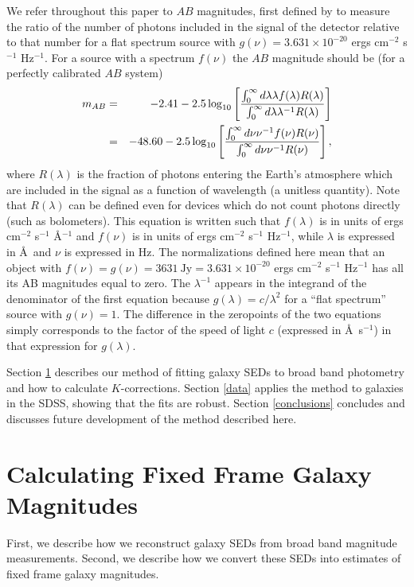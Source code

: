 \documentclass[10pt,preprint]{aastex}
\begin{document}
We refer throughout this paper to $AB$ magnitudes, first defined by
\citet{oke83a} to measure the ratio of the number of photons included
in the signal of the detector relative to that number for a flat
spectrum source with $g(\nu)=3.631 \times 10^{-20}$ ergs cm$^{-2}$
s$^{-1}$ Hz$^{-1}$. For a source with a spectrum $f(\nu)$ the $AB$
magnitude should be (for a perfectly calibrated $AB$ system)
\begin{eqnarray}
\label{ABdef}
m_{AB} &=& -2.41 - 2.5 \log_{10}\left[
\frac{\int_{0}^{\infty} d\lambda \lambda f(\lambda) R(\lambda)}
{\int_{0}^{\infty} d\lambda \lambda^{-1} R(\lambda)}\right]
\cr
&=& -48.60 - 2.5 \log_{10}\left[
\frac{\int_{0}^{\infty} d\nu \nu^{-1} f(\nu) R(\nu)}
{\int_{0}^{\infty} d\nu \nu^{-1} R(\nu)}\right],
\end{eqnarray}
where $R(\lambda)$ is the fraction of photons entering the Earth's
atmosphere which are included in the signal as a function of
wavelength (a unitless quantity). Note that $R(\lambda)$ can be
defined even for devices which do not count photons directly (such as
bolometers). This equation is written such that $f(\lambda)$ is in
units of ergs cm$^{-2}$ s$^{-1}$ \AA$^{-1}$ and $f(\nu)$ is in units
of ergs cm$^{-2}$ s$^{-1}$ Hz$^{-1}$, while $\lambda$ is expressed in
\AA\ and $\nu$ is expressed in Hz. The normalizations defined here
mean that an object with $f(\nu) = g(\nu) = 3631\mathrm{~Jy} = 3.631
\times 10^{-20}$ ergs cm$^{-2}$ s$^{-1}$ Hz$^{-1}$ has all its AB
magnitudes equal to zero.  The $\lambda^{-1}$ appears in the integrand
of the denominator of the first equation because
$g(\lambda)=c/\lambda^2$ for a ``flat spectrum'' source with
$g(\nu)=1$.  The difference in the zeropoints of the two equations
simply corresponds to the factor of the speed of light $c$ (expressed
in \AA\ s$^{-1}$) in that expression for $g(\lambda)$.

Section \ref{sedfit} describes our method of fitting galaxy SEDs to
broad band photometry and how to calculate $K$-corrections. Section
\ref{data} applies the method to galaxies in the SDSS, showing that
the fits are robust.  Section \ref{conclusions} concludes and
discusses future development of the method described here.

\section{Calculating Fixed Frame Galaxy Magnitudes}
\label{sedfit}

First, we describe how we reconstruct galaxy SEDs from broad band
magnitude measurements. Second, we describe how we convert these SEDs
into estimates of fixed frame galaxy magnitudes. 
\end{document}
